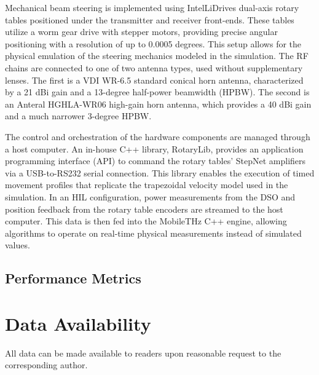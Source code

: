\documentclass[fleqn,10pt]{wlscirep}
\begin{document}
Mechanical beam steering is implemented using IntelLiDrives dual-axis rotary tables positioned under the transmitter and receiver front-ends. These tables utilize a worm gear drive with stepper motors, providing precise angular positioning with a resolution of up to 0.0005 degrees. This setup allows for the physical emulation of the steering mechanics modeled in the simulation. The RF chains are connected to one of two antenna types, used without supplementary lenses. The first is a VDI WR-6.5 standard conical horn antenna, characterized by a 21 dBi gain and a 13-degree half-power beamwidth (HPBW). The second is an Anteral HGHLA-WR06 high-gain horn antenna, which provides a 40 dBi gain and a much narrower 3-degree HPBW.

The control and orchestration of the hardware components are managed through a host computer. An in-house C++ library, RotaryLib, provides an application programming interface (API) to command the rotary tables' StepNet amplifiers via a USB-to-RS232 serial connection. This library enables the execution of timed movement profiles that replicate the trapezoidal velocity model used in the simulation. In an HIL configuration, power measurements from the DSO and position feedback from the rotary table encoders are streamed to the host computer. This data is then fed into the MobileTHz C++ engine, allowing algorithms to operate on real-time physical measurements instead of simulated values.

\subsection*{Performance Metrics}

\section*{Data Availability}
All data can be made available to readers upon reasonable request to the corresponding author. 



\end{document}
